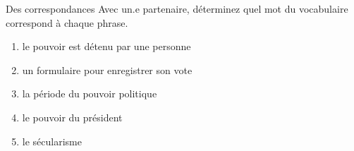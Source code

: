 \begin{frame}{Des correspondances}
  Avec un.e partenaire, déterminez quel mot du vocabulaire correspond à chaque phrase.
  \begin{enumerate}
    \item {} le pouvoir est détenu par une personne
    \item {} un formulaire pour enregistrer son vote
    \item {} la période du pouvoir politique
    \item {} le pouvoir du président
    \item {} le sécularisme
  \end{enumerate}
\end{frame}